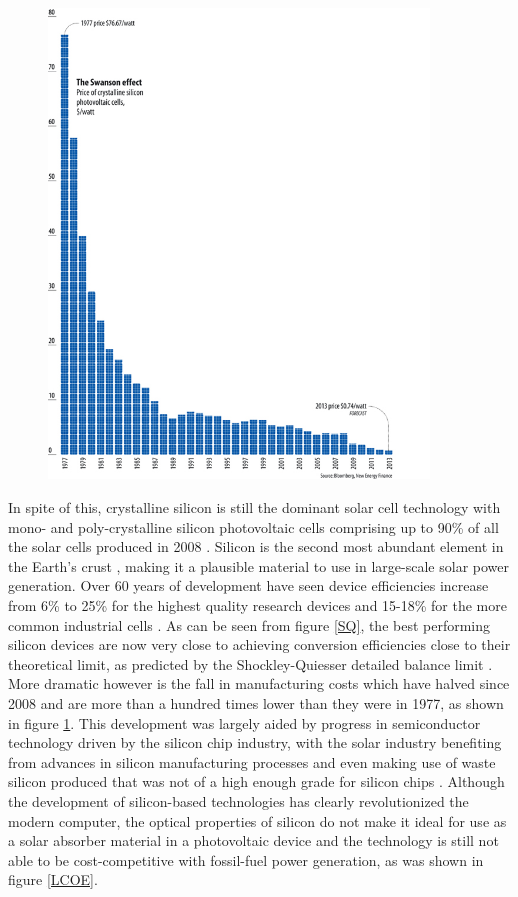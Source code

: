\begin{figure}[h!]
  \centering
    \includegraphics[width=0.9\textwidth]{figures/Si_cost.jpg}
    \caption{}
  \label{Si_cost}
\end{figure}

In spite of this, crystalline silicon is still the dominant solar cell technology with mono- and poly-crystalline silicon photovoltaic cells comprising up to 90\% of all the solar cells produced in 2008  \cite{Si_rev}. Silicon is the second most abundant element in the Earth's crust \cite{Si_abundance}, making it a plausible material to use in large-scale solar power generation. Over 60 years of development have seen device efficiencies increase from 6\% to 25\% for the highest quality research devices and 15-18\% for the more common industrial cells \cite{Si_rev}. As can be seen from figure \ref{SQ}, the best performing silicon devices are now very close to achieving conversion efficiencies close to their theoretical limit, as predicted by the Shockley-Quiesser detailed balance limit \cite{SQ_1961}. More dramatic however is the fall in manufacturing costs which have halved since 2008 and are more than a hundred times lower than they were in 1977, as shown in figure \ref{Si_cost}. This development was largely aided by progress in semiconductor technology driven by the silicon chip industry, with the solar industry benefiting from advances in silicon manufacturing processes and even making use of waste silicon produced that was not of a high enough grade for silicon chips \cite{PV_history1}. Although the development of silicon-based technologies has clearly revolutionized the modern computer, the optical properties of silicon do not make it ideal for use as a solar absorber material in a photovoltaic device and the technology is still not able to be cost-competitive with fossil-fuel power generation, as was shown in figure \ref{LCOE}.\\

